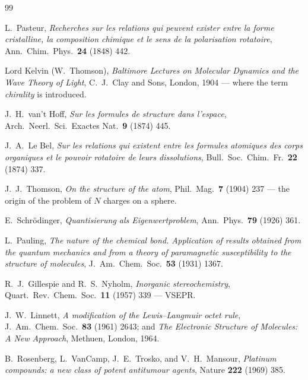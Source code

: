 \documentclass[11pt]{article}
\begin{document}
\begin{thebibliography}{99}
\small

 L.~Pasteur, \emph{Recherches sur les relations qui peuvent exister entre la
  forme cristalline, la composition chimique et le sens de la polarisation rotatoire},
  Ann.\ Chim.\ Phys.\ \textbf{24} (1848) 442.

 Lord Kelvin (W.~Thomson), \emph{Baltimore Lectures on Molecular Dynamics and
  the Wave Theory of Light}, C.~J.~Clay and Sons, London, 1904 --- where the term
  \emph{chirality} is introduced.

 J.~H.~van't Hoff, \emph{Sur les formules de structure dans l'espace},
  Arch.\ Neerl.\ Sci.\ Exactes Nat.\ \textbf{9} (1874) 445.

 J.~A.~Le Bel, \emph{Sur les relations qui existent entre les formules
  atomiques des corps organiques et le pouvoir rotatoire de leurs dissolutions},
  Bull.\ Soc.\ Chim.\ Fr.\ \textbf{22} (1874) 337.

 J.~J.~Thomson, \emph{On the structure of the atom}, Phil.\ Mag.\
  \textbf{7} (1904) 237 --- the origin of the problem of $N$ charges on a sphere.

 E.~Schr\"odinger, \emph{Quantisierung als Eigenwertproblem},
  Ann.\ Phys.\ \textbf{79} (1926) 361.

 L.~Pauling, \emph{The nature of the chemical bond. Application of results
  obtained from the quantum mechanics and from a theory of paramagnetic susceptibility to the
  structure of molecules}, J.~Am.~Chem.~Soc.\ \textbf{53} (1931) 1367.

 R.~J.~Gillespie and R.~S.~Nyholm, \emph{Inorganic stereochemistry},
  Quart.\ Rev.\ Chem.\ Soc.\ \textbf{11} (1957) 339 --- VSEPR.

 J.~W.~Linnett, \emph{A modification of the Lewis--Langmuir octet rule},
  J.~Am.~Chem.~Soc.\ \textbf{83} (1961) 2643; and \emph{The Electronic Structure of Molecules: A
  New Approach}, Methuen, London, 1964.

 B.~Rosenberg, L.~VanCamp, J.~E.~Trosko, and V.~H.~Mansour,
  \emph{Platinum compounds: a new class of potent antitumour agents}, Nature \textbf{222} (1969)
  385.


\end{thebibliography}
\end{document}
